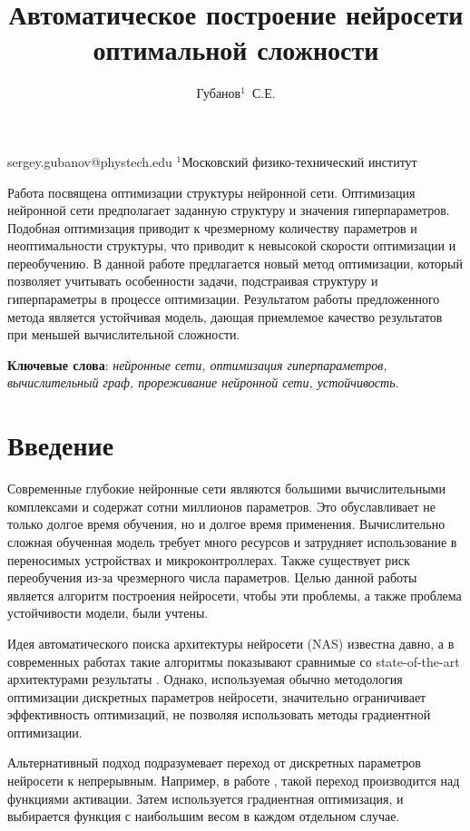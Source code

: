 \documentclass[12pt,twoside]{article}
\begin{document}
\title
    {Автоматическое построение нейросети оптимальной сложности}
\author
    {Губанов$^1$~С.Е.} %
\email
    {sergey.gubanov@phystech.edu}
\organization
    {$^1$Московский физико-технический институт}
\abstract
	{Работа посвящена оптимизации структуры нейронной сети. Оптимизация нейронной сети предполагает заданную структуру и значения гиперпараметров. Подобная оптимизация приводит к чрезмерному количеству параметров и неоптимальности структуры, что приводит к невысокой скорости оптимизации и переобучению. В данной работе предлагается новый метод оптимизации, который позволяет учитывать особенности задачи, подстраивая структуру и гиперпараметры в процессе оптимизации. Результатом работы предложенного метода является устойчивая модель, дающая приемлемое качество результатов при меньшей вычислительной сложности.
		
\bigskip
\textbf{Ключевые слова}: \emph {нейронные сети, оптимизация гиперпараметров, вычислительный граф, прореживание нейронной сети, устойчивость}.

}
\maketitle

\section{Введение}
Современные глубокие нейронные сети являются большими вычислительными комплексами и содержат сотни миллионов параметров\cite{deepCNN}. Это обуславливает не только долгое время обучения, но и долгое время применения. Вычислительно сложная обученная модель требует много ресурсов и затрудняет использование в переносимых устройствах и микроконтроллерах. Также существует риск переобучения из-за чрезмерного числа параметров\cite{overlearning}. Целью данной работы является алгоритм построения нейросети, чтобы эти проблемы, а также проблема устойчивости модели, были учтены. 

Идея автоматического поиска архитектуры нейросети (NAS) известна давно\cite{NAS1989}, а в современных работах такие алгоритмы показывают сравнимые со state-of-the-art архитектурами результаты \cite{zoph2016neural}. Однако, используемая обычно методология оптимизации дискретных параметров нейросети\cite{deeparchitect}, значительно ограничивает эффективность оптимизаций, не позволяя использовать методы градиентной оптимизации.

Альтернативный подход подразумевает переход от дискретных параметров нейросети к непрерывным. Например, в работе \cite{liu2018darts}, такой переход производится над функциями активации. Затем используется градиентная оптимизация\cite{gradient}, и выбирается функция с наибольшим весом в каждом отдельном случае.
\end{document}
